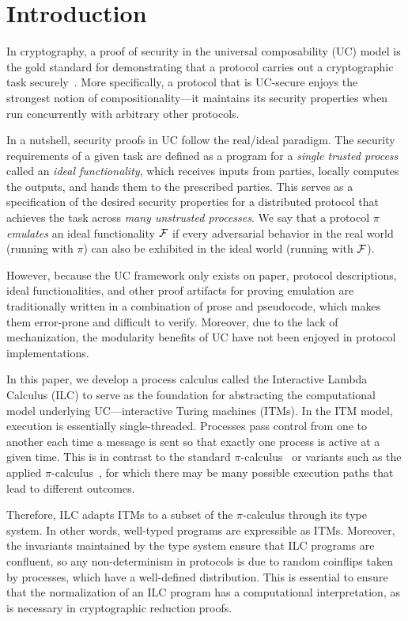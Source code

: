 \section{Introduction}
\label{sec:introduction}

In cryptography, a proof of security in the universal composability (UC) model
is the gold standard for demonstrating that a protocol carries out a
cryptographic task securely~\cite{canetti2001universally}. More specifically, a
protocol that is UC-secure enjoys the strongest notion of compositionality---it
maintains its security properties when run concurrently with arbitrary other
protocols.

In a nutshell, security proofs in UC follow the real/ideal paradigm. The
security requirements of a given task are defined as a program for a
\emph{single trusted process} called an \emph{ideal functionality}, which
receives inputs from parties, locally computes the outputs, and hands them to
the prescribed parties. This serves as a specification of the desired security
properties for a distributed protocol that achieves the task across \emph{many
  unstrusted processes}. We say that a protocol $\pi$ \emph{emulates} an ideal
functionality $\mathcal{{F}}$ if every adversarial behavior in the real world (running
with $\pi$) can also be exhibited in the ideal world (running with $\mathcal{{F}}$).

However, because the UC framework only exists on paper, protocol descriptions,
ideal functionalities, and other proof artifacts for proving emulation are
traditionally written in a combination of prose and pseudocode, which makes them
error-prone and difficult to verify. Moreover, due to the lack of mechanization,
the modularity benefits of UC have not been enjoyed in protocol implementations.

In this paper, we develop a process calculus called the Interactive Lambda
Calculus (ILC) to serve as the foundation for abstracting the computational
model underlying UC---interactive Turing machines (ITMs). In the ITM model,
execution is essentially single-threaded. Processes pass control from one to
another each time a message is sent so that exactly one process is active at a
given time. This is in contrast to the standard
$\pi$-calculus~\cite{milner1999communicating} or variants such as the applied
$\pi$-calculus~\cite{abadi2001mobile}, for which there may be many possible
execution paths that lead to different outcomes.

Therefore, ILC adapts ITMs to a subset of the $\pi$-calculus through its type
system. In other words, well-typed programs are expressible as ITMs. Moreover,
the invariants maintained by the type system ensure that ILC programs are
confluent, so any non-determinism in protocols is due to random coinflips taken
by processes, which have a well-defined distribution. This is essential to
ensure that the normalization of an ILC program has a computational
interpretation, as is necessary in cryptographic reduction proofs.

